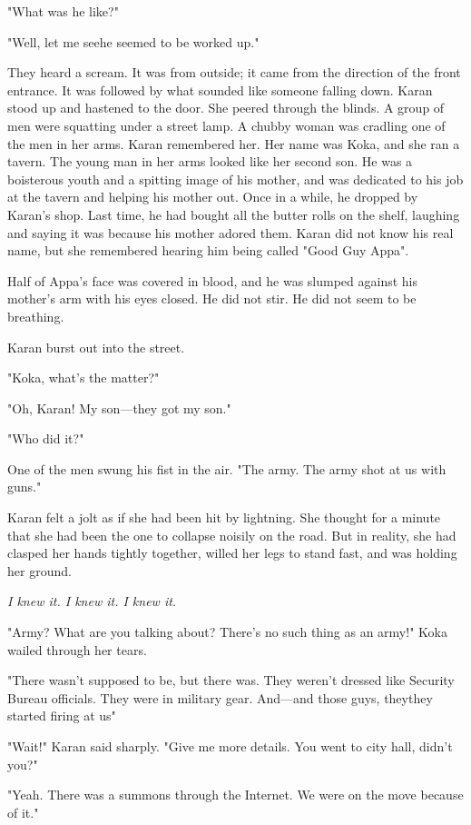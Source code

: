 "What was he like?"

"Well, let me see\el he seemed to be worked up."

They heard a scream. It was from outside; it came from the direction of
the front entrance. It was followed by what sounded like someone falling
down. Karan stood up and hastened to the door. She peered through the
blinds. A group of men were squatting under a street lamp. A chubby
woman was cradling one of the men in her arms. Karan remembered her. Her
name was Koka, and she ran a tavern. The young man in her arms looked
like her second son. He was a boisterous youth and a spitting image of
his mother, and was dedicated to his job at the tavern and helping his
mother out. Once in a while, he dropped by Karan's shop. Last time, he
had bought all the butter rolls on the shelf, laughing and saying it was
because his mother adored them. Karan did not know his real name, but
she remembered hearing him being called "Good Guy Appa".

Half of Appa's face was covered in blood, and he was slumped against his
mother's arm with his eyes closed. He did not stir. He did not seem to
be breathing.

Karan burst out into the street.

"Koka, what's the matter?"

"Oh, Karan! My son---they got my son."

"Who did it?"

One of the men swung his fist in the air. "The army. The army shot at us
with guns."

Karan felt a jolt as if she had been hit by lightning. She thought for a
minute that she had been the one to collapse noisily on the road. But in
reality, she had clasped her hands tightly together, willed her legs to
stand fast, and was holding her ground.

\emph{I knew it. I knew it. I knew it.}

"Army? What are you talking about? There's no such thing as an army!"
Koka wailed through her tears.

"There wasn't supposed to be, but there was. They weren't dressed like
Security Bureau officials. They were in military gear. And---and those
guys, they\el they started firing at us\el "

"Wait!" Karan said sharply. "Give me more details. You went to city
hall, didn't you?"

"Yeah. There was a summons through the Internet. We were on the move
because of it."

